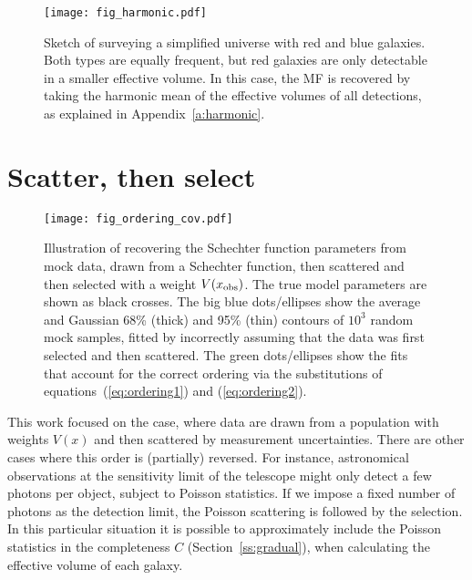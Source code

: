 \documentclass[a4paper,fleqn,usenatbib]{mnras}
\newcommand{\veff}{V}%
\renewcommand{\ss}[1]{Section~\ref{ss:#1}}
\renewcommand{\a}[1]{Appendix~\ref{a:#1}}
\begin{document}
\begin{figure}
\begin{center}
\texttt{[image: fig\_harmonic.pdf]}\vspace{0mm}
\caption{Sketch of surveying a simplified universe with red and blue galaxies. Both types are equally frequent, but red galaxies are only detectable in a smaller effective volume. In this case, the MF is recovered by taking the harmonic mean of the effective volumes of all detections, as explained in \a{harmonic}.}\label{fig:harmonic}
\end{center}
\end{figure}

\section{Scatter, then select}\label{a:ordering}

\begin{figure}
\begin{center}
\texttt{[image: fig\_ordering\_cov.pdf]}\vspace{-0.3cm}
\caption{Illustration of recovering the Schechter function parameters from mock data, drawn from a Schechter function, then scattered and then selected with a weight $V(x_{\rm obs})$. The true model parameters are shown as black crosses. The big blue \mbox{dots}/ellipses show the average and Gaussian 68\% (thick) and 95\% (thin) contours of $10^3$ random mock samples, fitted by incorrectly assuming that the data was first selected and then scattered. The green \mbox{dots}/ellipses show the fits that account for the correct ordering via the substitutions of equations~(\ref{eq:ordering1}) and (\ref{eq:ordering2}).}\label{fig:ordering_cov}
\end{center}
\end{figure}

This work focused on the case, where data are drawn from a population with weights $\veff(x)$ and then scattered by measurement uncertainties. There are other cases where this order is (partially) reversed. For instance, astronomical observations at the sensitivity limit of the telescope might only detect a few photons per object, subject to Poisson statistics. If we impose a fixed number of photons as the detection limit, the Poisson scattering is followed by the selection. In this particular situation it is possible to approximately include the Poisson statistics in the completeness $C$ (\ss{gradual}), when calculating the effective volume of each galaxy.
\end{document}
